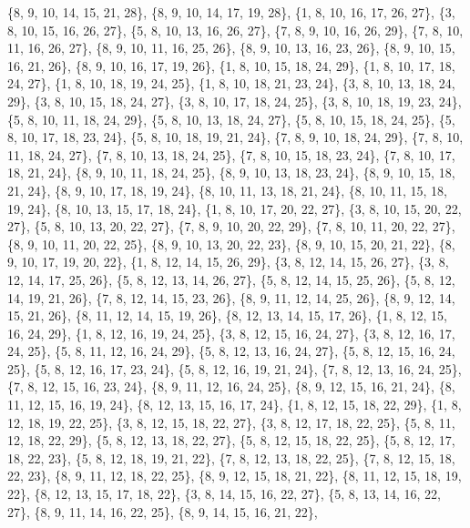 \documentclass[11pt,a4paper]{article}
\begin{document}
{\{8, 9, 10, 14, 15, 21, 28\}, \{8, 9, 10, 14, 17, 19, 28\}, \{1, 8, 10, 16, 17, 26, 27\}, \{3, 8, 10, 15, 16, 26, 27\}, \{5, 8, 10, 13, 16, 26, 27\},
\{7, 8, 9, 10, 16, 26, 29\}, \{7, 8, 10, 11, 16, 26, 27\}, \{8, 9, 10, 11, 16, 25, 26\}, \{8, 9, 10, 13, 16, 23, 26\}, \{8, 9, 10, 15, 16, 21, 26\},
\{8, 9, 10, 16, 17, 19, 26\}, \{1, 8, 10, 15, 18, 24, 29\}, \{1, 8, 10, 17, 18, 24, 27\}, \{1, 8, 10, 18, 19, 24, 25\}, \{1, 8, 10, 18, 21, 23, 24\},
\{3, 8, 10, 13, 18, 24, 29\}, \{3, 8, 10, 15, 18, 24, 27\}, \{3, 8, 10, 17, 18, 24, 25\}, \{3, 8, 10, 18, 19, 23, 24\}, \{5, 8, 10, 11, 18, 24, 29\},
\{5, 8, 10, 13, 18, 24, 27\}, \{5, 8, 10, 15, 18, 24, 25\}, \{5, 8, 10, 17, 18, 23, 24\}, \{5, 8, 10, 18, 19, 21, 24\}, \{7, 8, 9, 10, 18, 24, 29\},
\{7, 8, 10, 11, 18, 24, 27\}, \{7, 8, 10, 13, 18, 24, 25\}, \{7, 8, 10, 15, 18, 23, 24\}, \{7, 8, 10, 17, 18, 21, 24\}, \{8, 9, 10, 11, 18, 24, 25\},
\{8, 9, 10, 13, 18, 23, 24\}, \{8, 9, 10, 15, 18, 21, 24\}, \{8, 9, 10, 17, 18, 19, 24\}, \{8, 10, 11, 13, 18, 21, 24\}, \{8, 10, 11, 15, 18, 19, 24\},
\{8, 10, 13, 15, 17, 18, 24\}, \{1, 8, 10, 17, 20, 22, 27\}, \{3, 8, 10, 15, 20, 22, 27\}, \{5, 8, 10, 13, 20, 22, 27\}, \{7, 8, 9, 10, 20, 22, 29\},
\{7, 8, 10, 11, 20, 22, 27\}, \{8, 9, 10, 11, 20, 22, 25\}, \{8, 9, 10, 13, 20, 22, 23\}, \{8, 9, 10, 15, 20, 21, 22\}, \{8, 9, 10, 17, 19, 20, 22\},
\{1, 8, 12, 14, 15, 26, 29\}, \{3, 8, 12, 14, 15, 26, 27\}, \{3, 8, 12, 14, 17, 25, 26\}, \{5, 8, 12, 13, 14, 26, 27\}, \{5, 8, 12, 14, 15, 25, 26\},
\{5, 8, 12, 14, 19, 21, 26\}, \{7, 8, 12, 14, 15, 23, 26\}, \{8, 9, 11, 12, 14, 25, 26\}, \{8, 9, 12, 14, 15, 21, 26\}, \{8, 11, 12, 14, 15, 19, 26\},
\{8, 12, 13, 14, 15, 17, 26\}, \{1, 8, 12, 15, 16, 24, 29\}, \{1, 8, 12, 16, 19, 24, 25\}, \{3, 8, 12, 15, 16, 24, 27\}, \{3, 8, 12, 16, 17, 24, 25\},
\{5, 8, 11, 12, 16, 24, 29\}, \{5, 8, 12, 13, 16, 24, 27\}, \{5, 8, 12, 15, 16, 24, 25\}, \{5, 8, 12, 16, 17, 23, 24\}, \{5, 8, 12, 16, 19, 21, 24\},
\{7, 8, 12, 13, 16, 24, 25\}, \{7, 8, 12, 15, 16, 23, 24\}, \{8, 9, 11, 12, 16, 24, 25\}, \{8, 9, 12, 15, 16, 21, 24\}, \{8, 11, 12, 15, 16, 19, 24\},
\{8, 12, 13, 15, 16, 17, 24\}, \{1, 8, 12, 15, 18, 22, 29\}, \{1, 8, 12, 18, 19, 22, 25\}, \{3, 8, 12, 15, 18, 22, 27\}, \{3, 8, 12, 17, 18, 22, 25\},
\{5, 8, 11, 12, 18, 22, 29\}, \{5, 8, 12, 13, 18, 22, 27\}, \{5, 8, 12, 15, 18, 22, 25\}, \{5, 8, 12, 17, 18, 22, 23\}, \{5, 8, 12, 18, 19, 21, 22\},
\{7, 8, 12, 13, 18, 22, 25\}, \{7, 8, 12, 15, 18, 22, 23\}, \{8, 9, 11, 12, 18, 22, 25\}, \{8, 9, 12, 15, 18, 21, 22\}, \{8, 11, 12, 15, 18, 19, 22\},
\{8, 12, 13, 15, 17, 18, 22\}, \{3, 8, 14, 15, 16, 22, 27\}, \{5, 8, 13, 14, 16, 22, 27\}, \{8, 9, 11, 14, 16, 22, 25\}, \{8, 9, 14, 15, 16, 21, 22\},
}
\end{document}
